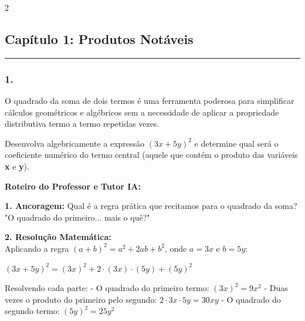\par\vspace{0.3cm} 
\raggedcolumns
\begin{multicols*}{2}
\vspace{0.1cm}

\subsection*{Capítulo 1: Produtos Notáveis}
\vspace{-0.2cm}\noindent\rule{\linewidth}{1.5pt} 
\par\vspace{\espacoPosTitulo}
\subsubsection*{1.} 
\begin{enunciadoLiteral}
O quadrado da soma de dois termos é uma ferramenta poderosa para simplificar cálculos geométricos e algébricos sem a necessidade de aplicar a propriedade distributiva termo a termo repetidas vezes. 

Desenvolva algebricamente a expressão $ (3x + 5y)^2 $ e determine qual será o coeficiente numérico do termo central (aquele que contém o produto das variáveis \textbf{x} e \textbf{y}).
\end{enunciadoLiteral}

\ifgabarito
    \begin{tcolorbox}[colback=CorTitUm!5, colframe=CorTitUm, boxrule=1pt, arc=4pt, left=6pt, right=6pt, top=6pt, bottom=6pt]
    \small\textbf{\textcolor{CorTitUm}{Roteiro do Professor e Tutor IA:}}\par\vspace{0.1cm}
    \color{CinzaEscuro}
    \textbf{1. Ancoragem:} Qual é a regra prática que recitamos para o quadrado da soma? "O quadrado do primeiro... mais o quê?"\par\vspace{0.1cm}
    \textbf{2. Resolução Matemática:}\\
    Aplicando a regra $ (a + b)^2 = a^2 + 2ab + b^2 $, onde $ a = 3x $ e $ b = 5y $:
    
    $ (3x + 5y)^2 = (3x)^2 + 2 \cdot (3x) \cdot (5y) + (5y)^2 $
    
    Resolvendo cada parte:
    - O quadrado do primeiro termo: $ (3x)^2 = 9x^2 $
    - Duas vezes o produto do primeiro pelo segundo: $ 2 \cdot 3x \cdot 5y = 30xy $
    - O quadrado do segundo termo: $ (5y)^2 = 25y^2 $
    

\end{tcolorbox}
\end{multicols*}

